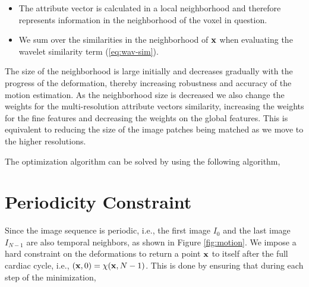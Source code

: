 \begin{itemize}
	\item The attribute vector is calculated in a local neighborhood and therefore represents information in the neighborhood of the voxel in question.
	\item We sum over the similarities in the neighborhood of $\mathbf{x}$ when evaluating the wavelet similarity term (\ref{eq:wav-sim}).
\end{itemize}

The size of the neighborhood is large initially and decreases gradually with the progress of the deformation, thereby increasing robustness and accuracy of the motion estimation. As the neighborhood size is decreased we also change the weights for the multi-resolution attribute vectors similarity, increasing the weights for the fine features and decreasing the weights on the global features. This is equivalent to reducing the size of the image patches being matched as we move to the higher resolutions.

The optimization algorithm can be solved by using the following algorithm,



\section {Periodicity Constraint}
Since the image sequence is periodic, i.e.,  the first image $I_0$ and the last image $I_{N-1}$ are also temporal neighbors, as shown in Figure \ref{fig:motion}. We impose a hard constraint on the deformations to return a point $\mathbf{x}$ to itself after the full cardiac cycle, i.e., $( \mathbf{x}, 0 ) = \chi ( \mathbf{x}, N-1 )$. This is done by ensuring that during each step of the minimization,


